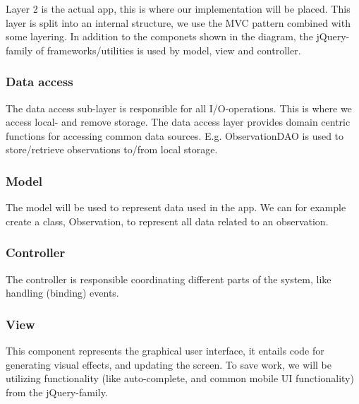 Layer 2 is the actual app, this is where our implementation will be placed.
This layer is split into an internal structure, we use the MVC pattern combined
with some layering. In addition to the componets shown in the diagram, the
jQuery-family of frameworks/utilities is used by model, view and controller.

	\subsubsection{Data access}
	
	The data access sub-layer is responsible for all I/O-operations. This is
	where we access local- and remove storage. The data access layer provides
	domain centric functions for accessing common data sources. E.g.
	ObservationDAO is used to store/retrieve observations to/from local storage.

	\subsubsection{Model}

	The model will be used to represent data used in the app. We can for example
	create a class, Observation, to represent all data related to an
	observation.

	\subsubsection{Controller}

	The controller is responsible coordinating different parts of the system,
	like handling (binding) events.

	\subsubsection{View}

	This component represents the graphical user interface, it entails code for
	generating visual effects, and updating the screen. To save work, we will be
	utilizing functionality (like auto-complete, and common mobile UI
	functionality) from the jQuery-family.
